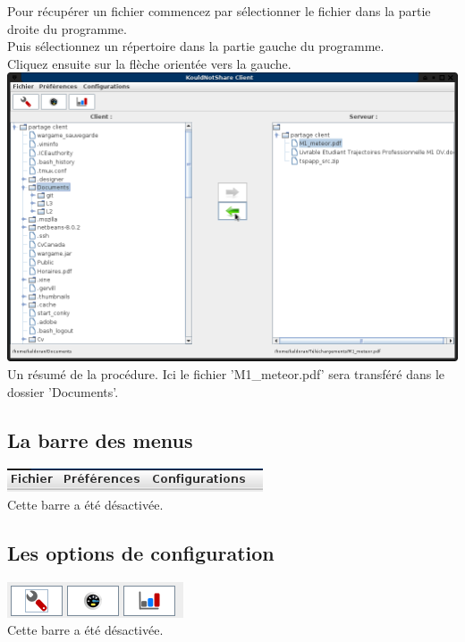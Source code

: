 \documentclass[12pt,a4paper]{article}
\begin{document}
\begin{center}
	Pour récupérer un fichier commencez par sélectionner le fichier dans la partie droite du programme. \\
	Puis sélectionnez un répertoire dans la partie gauche du programme. \\
	Cliquez ensuite sur la flèche orientée vers la gauche. \\
	\includegraphics[scale=0.4]{images/get.png} \\
	Un résumé de la procédure. Ici le fichier 'M1\_meteor.pdf' sera transféré dans le dossier 'Documents'. 
\end{center}


\subsection{La barre des menus}
\begin{center}
	\includegraphics[scale=0.5]{images/menu.png} \\
	Cette barre a été désactivée.
\end{center}

\subsection{Les options de configuration}
\begin{center}
	\includegraphics[scale=0.5]{images/option.png} \\
	Cette barre a été désactivée.
\end{center}
\end{document}
